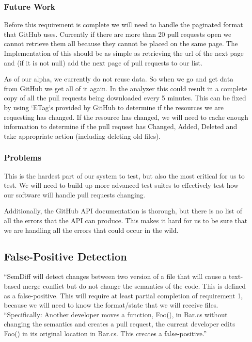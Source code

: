 \documentclass[10pt,draftclsnofoot,onecolumn]{IEEEtran}
\begin{document}
\subsubsection{Future Work}
Before this requirement is complete we will need to handle the paginated format that GitHub uses. Currently if there are more than 20 pull requests open we cannot retrieve them all because they cannot be placed on the same page. The Implementation of this should be as simple as retrieving the url of the next page and (if it is not null) add the next page of pull requests to our list.

As of our alpha, we currently do not reuse data. So when we go and get data from GitHub we get all of it again. In the analyzer this could result in a complete copy of all the pull requests being downloaded every 5 minutes. This can be fixed by using `ETag`s provided by GitHub to determine if the resources we are requesting has changed. If the resource has changed, we will need to cache enough information to determine if the pull request has Changed, Added, Deleted and take appropriate action (including deleting old files).

\subsubsection{Problems}
This is the hardest part of our system to test, but also the most critical for us to test. We will need to build up more advanced test suites to effectively test how our software will handle pull requests changing.

Additionally, the GitHub API documentation is thorough, but there is no list of all the errors that the API can produce. This makes it hard for us to be sure that we are handling all the errors that could occur in the wild.

\subsection{False-Positive Detection}
“SemDiff will detect changes between two version of a file that will cause a text-based merge conflict but do not change the semantics of the code. This is defined as a false-positive. This will require at least partial completion of requirement 1, because we will need to know the format/state that we will receive files.
“Specifically: Another developer moves a function, Foo(), in Bar.cs without changing the semantics and creates a pull request, the current developer edits Foo() in its original location in Bar.cs. This creates a false-positive.”
\end{document}
